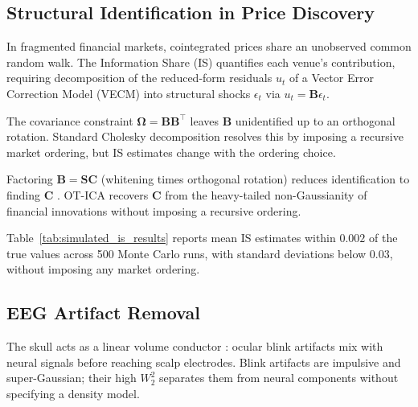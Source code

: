\documentclass{tpm2026} %
\begin{document}
\subsection{Structural Identification in Price Discovery}
In fragmented financial markets, cointegrated prices share an unobserved common random walk. The Information Share (IS) \citep{hasbrouck1995, baillie2002} quantifies each venue's contribution, requiring decomposition of the reduced-form residuals $u_t$ of a Vector Error Correction Model (VECM) \citep{engle1987, johansen1991} into structural shocks $\epsilon_t$ via $u_t = \mathbf{B}\epsilon_t$.

The covariance constraint $\boldsymbol{\Omega} = \mathbf{B}\mathbf{B}^\top$ leaves $\mathbf{B}$ unidentified up to an orthogonal rotation. Standard Cholesky decomposition resolves this by imposing a recursive market ordering, but IS estimates change with the ordering choice.

Factoring $\mathbf{B} = \mathbf{S}\mathbf{C}$ (whitening times orthogonal rotation) reduces identification to finding $\mathbf{C}$ \citep{zema2025}. OT-ICA recovers $\mathbf{C}$ from the heavy-tailed non-Gaussianity of financial innovations without imposing a recursive ordering.

\begin{table}[htbp]
    \centering
    \caption{Simulation Results for Information Share Recovery across 500 Monte Carlo runs. The estimated IS tightly matches the true IS without imposing arbitrary Cholesky recursive structures.}
    \label{tab:simulated_is_results}
\end{table}

Table~\ref{tab:simulated_is_results} reports mean IS estimates within $0.002$ of the true values across 500 Monte Carlo runs, with standard deviations below $0.03$, without imposing any market ordering.

\subsection{EEG Artifact Removal}
The skull acts as a linear volume conductor \citep{hyvarinen2001}: ocular blink artifacts mix with neural signals before reaching scalp electrodes. Blink artifacts are impulsive and super-Gaussian; their high $W_2^2$ separates them from neural components without specifying a density model.
\end{document}
